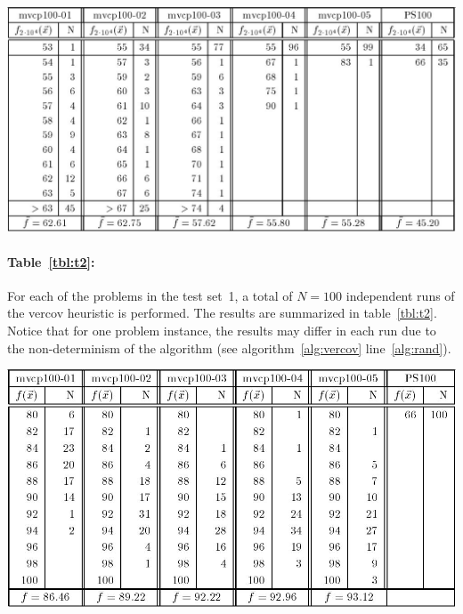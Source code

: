 \documentclass[12pt]{article}
\begin{document}
\begin{table}[!htbp]
\centering
\includegraphics[width=1\textwidth]{t1}
\caption[Results obtained by GA for graphs in test set~1]{%
Experimental results obtained by the genetic algorithm for five random graphs of size $n = 100$ with edge density: $d = 0.1$ (``mvcp100-01''), $d = 0.2$ (``mvcp100-02''), $d = 0.3$ (``mvcp100-03''), $d = 0.5$ (``mvcp100-04''), $d = 0.5$ (``mvcp100-05'') and the regular graph of size $n = 100 \ (k=32)$ from Papadimitriou and Steiglitz (``PS100'').%
}
\label{tbl:t1}
\end{table}

\paragraph{Table~\ref{tbl:t2}:}
For each of the problems in the test set~1, a total of $N=100$
independent runs of the vercov heuristic is performed.
The results are summarized in table~\ref{tbl:t2}.
Notice that for one problem instance, the results may differ in each run due to the
non-determinism of the algorithm (see algorithm~\ref{alg:vercov} line~\ref{alg:rand}).

\begin{table}[!htbp]
\centering
\includegraphics[width=1\textwidth]{t2}
\caption[Results obtained by vercov heuristic for graphs in test set~1]{%
Experimental results obtained by the vercov heuristic for five random graphs of size $n = 100$ with edge density: $d = 0.1$ (``mvcp100-01''), $d = 0.2$ (``mvcp100-02''), $d = 0.3$ (``mvcp100-03''), $d = 0.5$ (``mvcp100-04''), $d = 0.5$ (``mvcp100-05'') and the regular graph of size $n = 100 \ (k=32)$ from Papadimitriou and Steiglitz (``PS100'').%
}
\label{tbl:t2}
\end{table}
\end{document}

